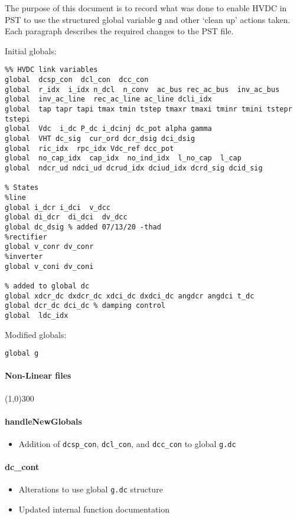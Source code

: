 \documentclass[12pt]{article}
\begin{document}
The purpose of this document is to record what was done to enable HVDC in PST to use the structured global variable \verb|g| and other `clean up' actions taken. \\
Each paragraph describes the required changes to the PST file.

Initial globals:
\begin{verbatim}
%% HVDC link variables 
global  dcsp_con  dcl_con  dcc_con
global  r_idx  i_idx n_dcl  n_conv  ac_bus rec_ac_bus  inv_ac_bus
global  inv_ac_line  rec_ac_line ac_line dcli_idx
global  tap tapr tapi tmax tmin tstep tmaxr tmaxi tminr tmini tstepr tstepi
global  Vdc  i_dc P_dc i_dcinj dc_pot alpha gamma 
global  VHT dc_sig  cur_ord dcr_dsig dci_dsig
global  ric_idx  rpc_idx Vdc_ref dcc_pot
global  no_cap_idx  cap_idx  no_ind_idx  l_no_cap  l_cap
global  ndcr_ud ndci_ud dcrud_idx dciud_idx dcrd_sig dcid_sig

% States
%line
global i_dcr i_dci  v_dcc
global di_dcr  di_dci  dv_dcc
global dc_dsig % added 07/13/20 -thad
%rectifier
global v_conr dv_conr
%inverter
global v_coni dv_coni

% added to global dc
global xdcr_dc dxdcr_dc xdci_dc dxdci_dc angdcr angdci t_dc
global dcr_dc dci_dc % damping control
global  ldc_idx
\end{verbatim}

Modified globals:
\begin{verbatim}
global g
\end{verbatim}
\paragraph{Non-Linear files}\line(1,0){300}
\paragraph{handleNewGlobals}
	\begin{itemize}
		\item Addition of \verb|dcsp_con|, \verb|dcl_con|, and \verb|dcc_con| to global \verb|g.dc|
	\end{itemize}
\paragraph{dc\_cont}
	\begin{itemize}
		\item Alterations to use global \verb|g.dc| structure
		\item Updated internal function documentation
	\end{itemize}
\end{document}

